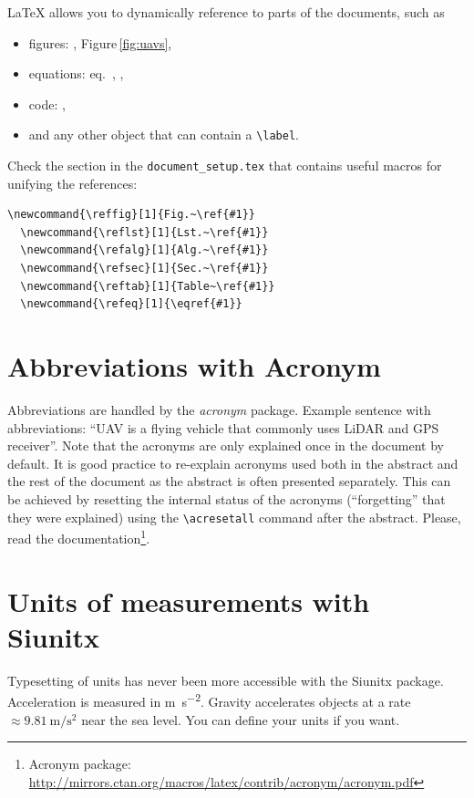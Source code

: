 LaTeX allows you to dynamically reference to parts of the documents, such as
\begin{itemize}
  \item figures: , Figure\,\ref{fig:uavs},
  \item equations: eq.~, ,
  \item code: ,
  \item and any other object that can contain a \texttt{\textbackslash{}label}.
\end{itemize}
Check the section in the \texttt{document\_setup.tex} that contains useful macros for unifying the references:
\begin{lstlisting}[caption={LaTeX macros for referencing to document elements.},label={lst:references}]
  \newcommand{\reffig}[1]{Fig.~\ref{#1}}
  \newcommand{\reflst}[1]{Lst.~\ref{#1}}
  \newcommand{\refalg}[1]{Alg.~\ref{#1}}
  \newcommand{\refsec}[1]{Sec.~\ref{#1}}
  \newcommand{\reftab}[1]{Table~\ref{#1}}
  \newcommand{\refeq}[1]{\eqref{#1}}
\end{lstlisting}

\section{Abbreviations with Acronym}

Abbreviations are handled by the \emph{acronym} package.
Example sentence with abbreviations: ``\ac{UAV} is a flying vehicle that commonly uses \ac{LiDAR} and \ac{GPS} receiver''.
Note that the acronyms are only explained once in the document by default.
It is good practice to re-explain acronyms used both in the abstract and the rest of the document as the abstract is often presented separately.
This can be achieved by resetting the internal status of the acronyms (\enquote{forgetting} that they were explained) using the \texttt{\textbackslash{}acresetall} command after the abstract.
Please, read the documentation\footnote{Acronym package: \url{http://mirrors.ctan.org/macros/latex/contrib/acronym/acronym.pdf}}.

\section{Units of measurements with Siunitx}

Typesetting of units has never been more accessible with the Siunitx package.
Acceleration is measured in \si{\meter\per\second\squared}.
Gravity accelerates objects at a rate $\approx \SI{9.81}{\meter\per\second\squared}$ near the sea level.
You can define your units if you want.

